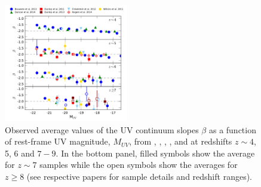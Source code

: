\begin{figure}
  \includegraphics[width=0.48\textwidth]{plots/Fig2.pdf}
  \caption{Observed average values of the UV continuum slopes $\beta$ as a function of rest-frame UV magnitude, $M_{UV}$, from \citet{Wilkins:2011fs}, \citet{Dunlop:2011jl,Dunlop:2013kp}, \citet{2012ApJ...756..164F}, \citet{Bouwens:2013vf}, \citet{Duncan:2014gh} and \citet{Rogers:2014bn} at redshifts $z\sim4$, 5, 6 and $7-9$. In the bottom panel, filled symbols show the average for $z\sim7$ samples while the open symbols show the averages for $z\geq 8$ (see respective papers for sample details and redshift ranges).}
  \label{fig:beta_z}
\end{figure}


